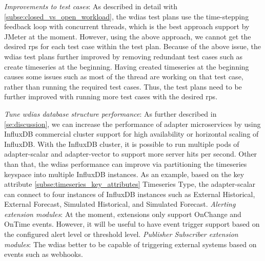 \emph{Improvements to test cases}:
As described in detail with \cref{subse:closed_vs_open_workload}, the \acrshort{wdias} test plans use the time-stepping feedback loop with concurrent threads, which is the best approach support by JMeter at the moment. However, using the above approach, we cannot get the desired \acrshort{rps} for each test case within the test plan.
Because of the above issue, the \acrshort{wdias} test plans further improved by removing redundant test cases such as create timeseries at the beginning. Having created timeseries at the beginning causes some issues such as most of the thread are working on that test case, rather than running the required test cases. Thus, the test plans need to be further improved with running more test cases with the desired \acrshort{rps}.

\emph{Tune \acrshort{wdias} database structure performance}:
As further described in \cref{se:discussion}, we can increase the performance of adapter microservices by using InfluxDB commercial cluster support for high availability or horizontal scaling of InfluxDB. With the InfluxDB cluster, it is possible to run multiple pods of adapter-scalar and adapter-vector to support more server hits per second. Other than that, the \acrshort{wdias} performance can improve via partitioning the timeseries keyspace into multiple InfluxDB instances. As an example, based on the key attribute \cref{subse:timeseries_key_attributes} Timeseries Type, the adapter-scalar can connect to four instances of InfluxDB instances such as External Historical, External Forecast, Simulated Historical, and Simulated Forecast.
\emph{Alerting extension modules}: At the moment, extensions only support OnChange and OnTime events. However, it will be useful to have event trigger support based on the configured alert level or threshold level. 
\emph{Publisher Subscriber extension modules}: The \acrshort{wdias} better to be capable of triggering external systems based on events such as webhooks.
